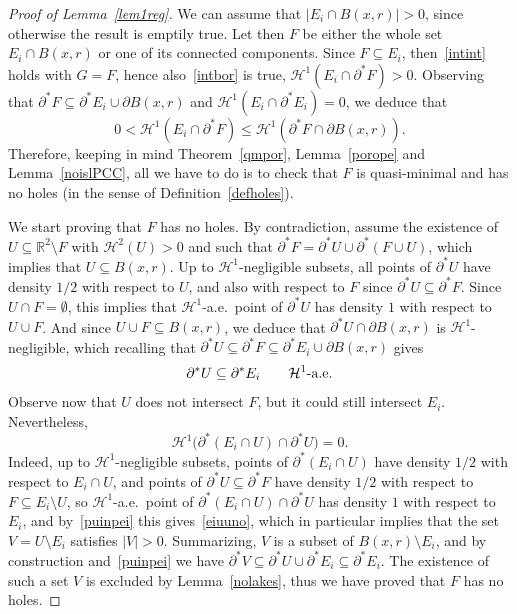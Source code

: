 \documentclass[JEP,XML,SOM,Unicode,NoFloatCountersInSection]{cedram}
\newcommand\R{\mathbb{R}}
\renewcommand\H{\mathcal{H}}
\theoremstyle{plain}
\theoremstyle{definition}
\begin{document}
\begin{proof}[Proof of Lemma~\ref{lem1reg}]
We can assume that $|E_i\cap B(x,r)|>0$, since otherwise the result is emptily true. Let then $F$ be either the whole set $E_i\cap B(x,r)$ or one of its connected components. Since $F\subseteq E_i$, then~\eqref{intint} holds with $G=F$, hence also~\eqref{intbor} is true, \ie $\H^1(E_i \cap \partial^* F)>0$. Observing that $\partial^* F\subseteq \partial^* E_i \cup \partial B(x,r)$ and $\H^1(E_i\cap\partial^* E_i)=0$, we deduce that
\[
0<\H^1(E_i \cap\partial^* F)\leq\H^1(\partial^* F\cap \partial B(x,r)).
\]
Therefore, keeping in mind Theorem~\ref{qmpor}, Lemma~\ref{porope} and Lemma~\ref{noislPCC}, all we have to do is to check that $F$ is quasi-minimal and has no holes (in the sense of Definition~\ref{defholes}).

We start proving that $F$ has no holes. By contradiction, assume the existence of $U\subseteq\R^2\setminus F$ with $\H^2(U)>0$ and such that $\partial^* F =\partial^* U \cup \partial^*(F\cup U)$, which implies that $U\subseteq B(x,r)$. Up to $\H^1$-negligible subsets, all points of $\partial^* U$ have density $1/2$ with respect to $U$, and also with respect to $F$ since $\partial^* U \subseteq \partial^* F$. Since $U\cap F=\emptyset$, this implies that $\H^1$-a.e.\ point of $\partial^* U$ has density $1$ with respect to $U\cup F$. And since $U\cup F\subseteq B(x,r)$, we deduce that $\partial^* U\cap\partial B(x,r)$ is $\H^1$-negligible, which recalling that $\partial^* U \subseteq \partial^* F \subseteq \partial^* E_i \cup \partial B(x,r)$ gives
\begin{equation}\label{puinpei}
\partial^* U\subseteq \partial^* E_i \qquad \H^1\hbox{-a.e.}
\end{equation}
Observe now that $U$ does not intersect $F$, but it could still intersect $E_i$. Nevertheless,
\begin{equation}\label{eiuuno}
\H^1\big(\partial^*(E_i\cap U) \cap \partial^* U \big)=0.
\end{equation}
Indeed, up to $\H^1$-negligible subsets, points of $\partial^*(E_i \cap U)$ have density $1/2$ with respect to $E_i\cap U$, and points of $\partial^* U\subseteq \partial^* F$ have density $1/2$ with respect to $F\subseteq E_i\setminus U$, so $\H^1$-a.e.\ point of $\partial^*(E_i\cap U) \cap \partial^* U$ has density $1$ with respect to $E_i$, and by~\eqref{puinpei} this gives~\eqref{eiuuno}, which in particular implies that the set $V=U\setminus E_i$ satisfies $|V|>0$. Summarizing, $V$ is a subset of $B(x,r)\setminus E_i$, and by construction and~\eqref{puinpei} we have $\partial^* V\subseteq \partial^* U \cup \partial^* E_i\subseteq \partial^* E_i$. The existence of such a set $V$ is excluded by Lemma~\ref{nolakes}, thus we have proved that $F$ has no holes.


\end{proof}
\end{document}
